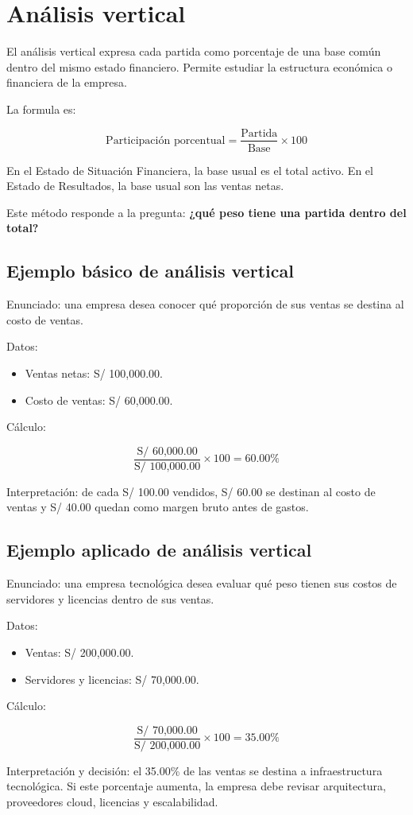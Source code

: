 \section{Análisis vertical}

El análisis vertical expresa cada partida como porcentaje de una base común dentro del mismo estado financiero. Permite estudiar la estructura económica o financiera de la empresa.

La formula es:

\[
\text{Participación porcentual} =
\frac{\text{Partida}}{\text{Base}} \times 100
\]

En el Estado de Situación Financiera, la base usual es el total activo. En el Estado de Resultados, la base usual son las ventas netas.

Este método responde a la pregunta: \textbf{¿qué peso tiene una partida dentro del total?}

\subsection{Ejemplo básico de análisis vertical}

Enunciado: una empresa desea conocer qué proporción de sus ventas se destina al costo de ventas.

Datos:

\begin{itemize}
  \item Ventas netas: S/ 100,000.00.
  \item Costo de ventas: S/ 60,000.00.
\end{itemize}

Cálculo:

\[
\frac{\text{S/ 60,000.00}}{\text{S/ 100,000.00}} \times 100 = 60.00\%
\]

Interpretación: de cada S/ 100.00 vendidos, S/ 60.00 se destinan al costo de ventas y S/ 40.00 quedan como margen bruto antes de gastos.

\subsection{Ejemplo aplicado de análisis vertical}

Enunciado: una empresa tecnológica desea evaluar qué peso tienen sus costos de servidores y licencias dentro de sus ventas.

Datos:

\begin{itemize}
  \item Ventas: S/ 200,000.00.
  \item Servidores y licencias: S/ 70,000.00.
\end{itemize}

Cálculo:

\[
\frac{\text{S/ 70,000.00}}{\text{S/ 200,000.00}} \times 100 = 35.00\%
\]

Interpretación y decisión: el 35.00\% de las ventas se destina a infraestructura tecnológica. Si este porcentaje aumenta, la empresa debe revisar arquitectura, proveedores cloud, licencias y escalabilidad.
